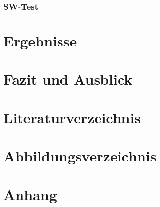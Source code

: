 \documentclass[a4paper, portrait, 12pt]{scrartcl} %
\begin{document}
\subsubsection{SW-Test}

\pagebreak


\pagebreak

\section{Ergebnisse}

\pagebreak

\section{Fazit und Ausblick}

\pagebreak

\section{Literaturverzeichnis}
\printbibliography
\pagebreak

\section{Abbildungsverzeichnis}
\listoffigures
\pagebreak




\appendix
\section{Anhang}
\label{sec:appendix_a}

  
\end{document}
